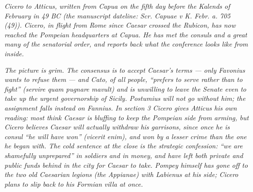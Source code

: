 
\textit{Cicero to Atticus, written from Capua on the fifth
day before the Kalends of February in 49 BC (the manuscript
dateline: \textit{Scr. Capuae v K. Febr. a. 705 (49)}).
Cicero, in flight from Rome since Caesar crossed the
Rubicon, has now reached the Pompeian headquarters at
Capua. He has met the consuls and a great many of the
senatorial order, and reports back what the conference
looks like from inside.}

\textit{The picture is grim. The consensus is to accept
Caesar's terms --- only Favonius wants to refuse them ---
and Cato, of all people, ``prefers to serve rather than to
fight'' (\emph{servire quam pugnare mavult}) and is
unwilling to leave the Senate even to take up the urgent
governorship of Sicily. Postumius will not go without him;
the assignment falls instead on Fannius. In section 3
Cicero gives Atticus his own reading: most think Caesar
is bluffing to keep the Pompeian side from arming, but
Cicero believes Caesar will actually withdraw his
garrisons, since once he is consul ``he will have won''
(\emph{vicerit enim}), and won by a lesser crime than the
one he began with. The cold sentence at the close is the
strategic confession: ``we are shamefully unprepared'' in
soldiers and in money, and have left both private and
public funds behind in the city for Caesar to take. Pompey
himself has gone off to the two old Caesarian legions
(the Appianae) with Labienus at his side; Cicero plans to
slip back to his Formian villa at once.}
